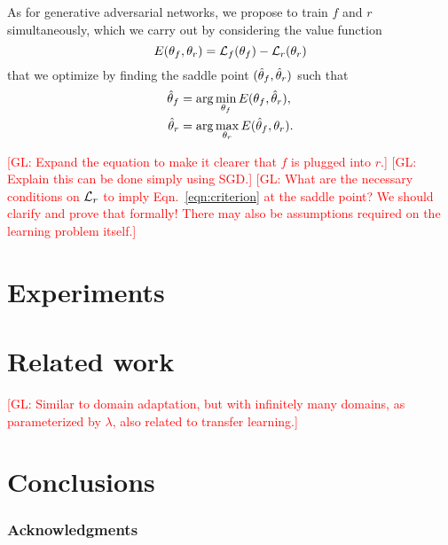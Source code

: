 \documentclass{article}
\newcommand{\glnote}[1]{\textcolor{red}{[GL: #1]}}
\theoremstyle{plain}
\begin{document}
As for generative adversarial networks, we propose to
train $f$ and $r$ simultaneously, which we carry out by considering
the value function
\begin{equation}
    E(\theta_f, \theta_r) = {\cal L}_f(\theta_f) - {\cal L}_r(\theta_r)
\end{equation}
that we optimize by finding the saddle point $(\smash{\hat\theta_f}, \smash{\hat\theta_r})$ such that
\begin{align}
    \smash{\hat\theta_f} &= \arg \min_{\theta_f} E(\theta_f, \smash{\hat\theta_r}), \\
    \smash{\hat\theta_r} &= \arg \max_{\theta_r} E(\smash{\hat\theta_f}, \theta_r).
\end{align}

\glnote{Expand the equation to make it clearer that $f$ is plugged into $r$.}
\glnote{Explain this can be done simply using SGD.}
\glnote{What are the necessary conditions on ${\cal L}_r$ to imply
Eqn.~\ref{eqn:criterion} at the saddle point? We should clarify and prove that
formally! There may also be assumptions required on the learning problem itself.}

\section{Experiments}

\section{Related work}

\glnote{Similar to domain adaptation, but with infinitely many domains,
as parameterized by $\lambda$, also related to transfer learning.}

\section{Conclusions}

\subsubsection*{Acknowledgments}


{\small
}
\end{document}
